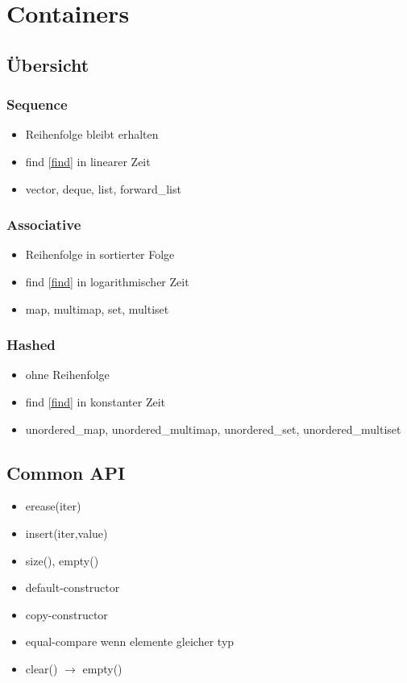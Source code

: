 \section{Containers}
\subsection{Übersicht}
\subsubsection{Sequence}
\begin{itemize}
	\item Reihenfolge bleibt erhalten
	\item find \ref{find} in linearer Zeit
	\item vector, deque, list, forward\_list
\end{itemize}
\subsubsection{Associative}
\begin{itemize}
	\item Reihenfolge in sortierter Folge
	\item find \ref{find} in logarithmischer Zeit
	\item map, multimap, set, multiset
\end{itemize}
\subsubsection{Hashed}
\begin{itemize}
	\item ohne Reihenfolge
	\item find \ref{find} in konstanter Zeit
	\item unordered\_map, unordered\_multimap, unordered\_set, unordered\_multiset
\end{itemize}
\subsection{Common API}
\begin{itemize}
	\item erease(iter)
	\item insert(iter,value)
	\item size(), empty()
	\item default-constructor
	\item copy-constructor
	\item equal-compare wenn elemente gleicher typ
	\item clear() $\rightarrow$ empty()
\end{itemize}
